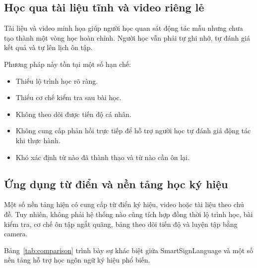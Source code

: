 \subsection{Học qua tài liệu tĩnh và video riêng lẻ}

Tài liệu và video minh họa giúp người học quan sát động tác mẫu nhưng chưa tạo
thành một vòng học hoàn chỉnh. Người học vẫn phải tự ghi nhớ, tự đánh giá kết
quả và tự lên lịch ôn tập.

Phương pháp này tồn tại một số hạn chế:

\begin{itemize}
  \item Thiếu lộ trình học rõ ràng.
  \item Thiếu cơ chế kiểm tra sau bài học.
  \item Không theo dõi được tiến độ cá nhân.
  \item Không cung cấp phản hồi trực tiếp để hỗ trợ người học tự đánh giá động
        tác khi thực hành.
  \item Khó xác định từ nào đã thành thạo và từ nào cần ôn lại.
\end{itemize}

\subsection{Ứng dụng từ điển và nền tảng học ký hiệu}

Một số nền tảng hiện có cung cấp từ điển ký hiệu, video hoặc tài liệu theo chủ
đề. Tuy nhiên, không phải hệ thống nào cũng tích hợp đồng thời lộ trình học,
bài kiểm tra, cơ chế ôn tập ngắt quãng, bảng theo dõi tiến độ và luyện tập bằng
camera.

Bảng~\ref{tab:comparison} trình bày sự khác biệt giữa SmartSignLanguage và một
số nền tảng hỗ trợ học ngôn ngữ ký hiệu phổ biến.

